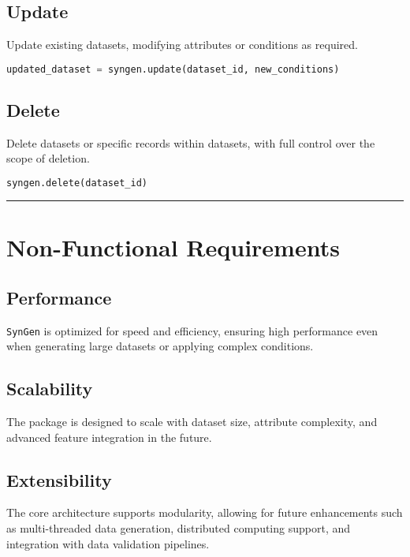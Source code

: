 \documentclass{article}
\newcommand{\horizbar}{
    \vspace{1em}
    \hrule height 1pt
    \vspace{1em}
}
\begin{document}
    \subsection{Update}
    Update existing datasets, modifying attributes or conditions as required.

    \begin{lstlisting}[language=Python, caption=API Example: Update]
updated_dataset = syngen.update(dataset_id, new_conditions)
    \end{lstlisting}

    \subsection{Delete}
    Delete datasets or specific records within datasets, with full control over the scope of deletion.

    \begin{lstlisting}[language=Python, caption=API Example: Delete]
syngen.delete(dataset_id)
    \end{lstlisting}

    \horizbar


    \section{Non-Functional Requirements}

    \subsection{Performance}
    \texttt{SynGen} is optimized for speed and efficiency, ensuring high performance even when generating large datasets or applying complex conditions.

    \subsection{Scalability}
    The package is designed to scale with dataset size, attribute complexity, and advanced feature integration in the future.

    \subsection{Extensibility}
    The core architecture supports modularity, allowing for future enhancements such as multi-threaded data generation, distributed computing support, and integration with data validation pipelines.
\end{document}
